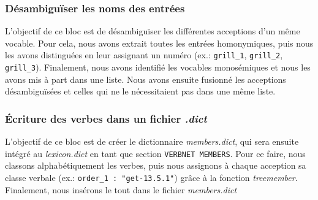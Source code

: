 \subsubsection{Désambiguïser les noms des entrées}

L'objectif de ce bloc est de désambiguïser les différentes acceptions d'un même vocable. Pour cela, nous avons extrait toutes les entrées homonymiques, puis nous les avons distinguées en leur assignant un numéro (ex.: \texttt{grill\_1}, \texttt{grill\_2}, \texttt{grill\_3}). Finalement, nous avons identifié les vocables monosémiques et nous les avons mis à part dans une liste. Nous avons ensuite fusionné les acceptions désambiguïsées et celles qui ne le nécessitaient pas dans une même liste.

\subsubsection{Écriture des verbes dans un fichier \emph{.dict}}

L'objectif de ce bloc est de créer le dictionnaire \emph{members.dict}, qui sera ensuite intégré au \emph{lexicon.dict} en tant que section \texttt{VERBNET MEMBERS}. Pour ce faire, nous classons alphabétiquement les verbes, puis nous assignons à chaque acception sa classe verbale (ex.: \lstinline|order_1 : "get-13.5.1"|) grâce à la fonction \emph{treemember}. Finalement, nous insérons le tout dans le fichier \emph{members.dict}


